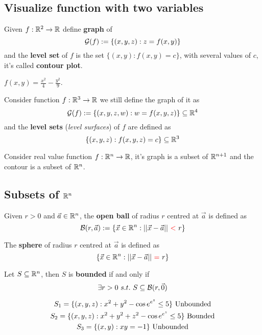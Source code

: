 \documentclass[]{article}
\begin{document}
		\subsection{Visualize function with two variables}
		\begin{definition}
			Given ${f}: {\mathbb{R}^2} \to {\mathbb{R}}$ define \textbf{graph} of 
			\[
				\mathcal{{G}}(f):=\{(x,y,z):z=f(x,y)\}
			\]
			and the \textbf{level set} of $f$ is the set $\{(x,y) : f(x,y) = c\}$, with several values of $c$, it's called \textbf{contour plot}.
		\end{definition}
		\begin{example}
			$f(x,y) = \frac{x^2}{4}-\frac{y^2}{9}$.
		\end{example}
		\begin{definition}
			Consider function ${f}: {\mathbb{R}^3} \to {\mathbb{R}}$ we still define the graph of it as 
			\[
				\mathcal{{G}}(f) := \{(x,y,z,w): w = f(x,y,z)\} \subseteq \mathbb{R}^4
			\]
			and the \textbf{level sets} (\emph{level surfaces}) of $f$ are defined as
			\[
				\{(x,y,z): f(x,y,z) = c\} \subseteq \mathbb{R}^3
			\]
		\end{definition}
		
		\begin{definition}
			Consider real value function ${f}: {\mathbb{R}^n} \to {\mathbb{R}}$, it's graph is a subset of $\mathbb{R}^{n+1}$ and the contour is a subset of $\mathbb{R}^n$.
		\end{definition}
		
		\subsection{Subsets of $\mathbb{R}^n$}
		\begin{definition}
			Given $r > 0$ and $\vec{a} \in \mathbb{R}^n$, the \textbf{open ball} of radius $r$ centred at $\vec{a}$ is defined as 
			\[
				\mc{B}(r, \vec{a}) :=
				\{\vec{x} \in \R^n: \Norm{\vec{x} - \vec{a}}\ \textcolor{red}{<}\ r\}
			\]
		\end{definition}
		
		\begin{definition}
			The \textbf{sphere} of radius $r$ centred at $\vec{a}$ is defined as 
			\[
				\{\vec{x} \in \mathbb{R}^n: \vert \vert {\vec{x} - \vec{a}} \vert \vert\ \textcolor{red}{=}\ r\}
			\]
		\end{definition}
		
		\begin{definition}
			Let $S \subseteq \mathbb{R}^n$, then $S$ is \textbf{bounded} if and only if
			\[
				\exists r > 0\ s.t.\ S \subseteq \mathcal{{B}}(r, \vec{0})
			\]
		\end{definition}
		
		\begin{example}
			\begin{gather*}
				S_1 = \{(x,y,z): x^2 + y^2 - \cos{e^{e^z}} \leq 5\} \text{{ Unbounded}}\\
				S_2 = \{(x,y,z): x^2 + y^2 + z^2 - \cos{e^{e^z}} \leq 5\} \text{{ Bounded}}\\
				S_3 = \{(x,y): xy=-1\} \text{{ Unbounded}} \\
			\end{gather*}
		\end{example}
\end{document}

